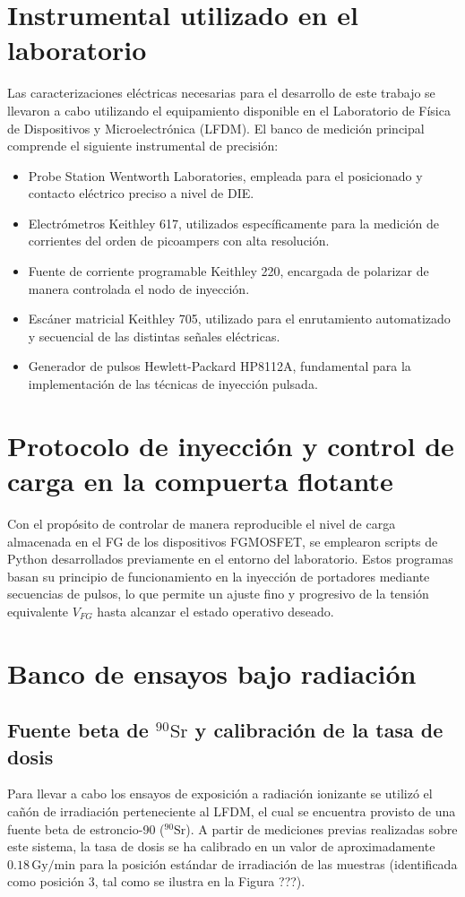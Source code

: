 \documentclass[12pt,a4paper,oneside]{book}
\begin{document}
\section{Instrumental utilizado en el laboratorio}
Las caracterizaciones eléctricas necesarias para el desarrollo de este trabajo se llevaron a cabo utilizando el equipamiento disponible en el Laboratorio de Física de Dispositivos y Microelectrónica (LFDM). El banco de medición principal comprende el siguiente instrumental de precisión:
\begin{itemize}
    \item Probe Station Wentworth Laboratories, empleada para el posicionado y contacto eléctrico preciso a nivel de DIE.
    \item Electrómetros Keithley 617, utilizados específicamente para la medición de corrientes del orden de picoampers con alta resolución.
    \item Fuente de corriente programable Keithley 220, encargada de polarizar de manera controlada el nodo de inyección.
    \item Escáner matricial Keithley 705, utilizado para el enrutamiento automatizado y secuencial de las distintas señales eléctricas.
    \item Generador de pulsos Hewlett-Packard HP8112A, fundamental para la implementación de las técnicas de inyección pulsada.
\end{itemize}

\section{Protocolo de inyección y control de carga en la compuerta flotante}
Con el propósito de controlar de manera reproducible el nivel de carga almacenada en el FG de los dispositivos FGMOSFET, se emplearon scripts de Python desarrollados previamente en el entorno del laboratorio. Estos programas basan su principio de funcionamiento en la inyección de portadores mediante secuencias de pulsos, lo que permite un ajuste fino y progresivo de la tensión equivalente $V_{FG}$ hasta alcanzar el estado operativo deseado.

\section{Banco de ensayos bajo radiación}
\subsection[Fuente beta de 90Sr y tasa de dosis]{Fuente beta de \texorpdfstring{$^{90}\text{Sr}$}{90Sr} y calibración de la tasa de dosis}
Para llevar a cabo los ensayos de exposición a radiación ionizante se utilizó el cañón de irradiación perteneciente al LFDM, el cual se encuentra provisto de una fuente beta de estroncio-90 ($^{90}\text{Sr}$). A partir de mediciones previas realizadas sobre este sistema, la tasa de dosis se ha calibrado en un valor de aproximadamente $0.18\,\text{Gy/min}$ para la posición estándar de irradiación de las muestras (identificada como posición 3, tal como se ilustra en la Figura ???).
\end{document}
